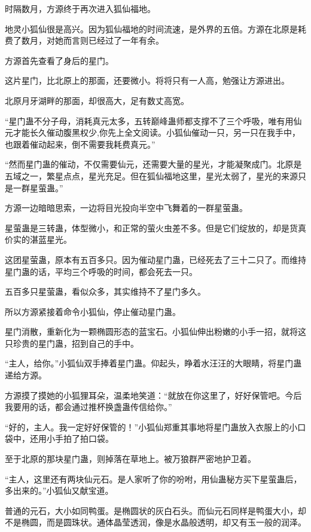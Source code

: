 
\begin{this_body}



时隔数月，方源终于再次进入狐仙福地。

地灵小狐仙很是高兴。因为狐仙福地的时间流速，是外界的五倍。方源在北原是耗费了数月，对她而言则已经过了一年有余。

方源首先查看了身后的星门。

这片星门，比北原上的那面，还要微小。将将只有一人高，勉强让方源进出。

北原月牙湖畔的那面，却很高大，足有数丈高宽。

“星门蛊不分子母，消耗真元太多，五转巅峰蛊师都支撑不了三个呼吸，唯有用仙元才能长久催动腹黑权少,你先上全文阅读。小狐仙催动一只，另一只在我手中，也跟着催动起来，倒不需要我耗费真元。”

“然而星门蛊的催动，不仅需要仙元，还需要大量的星光，才能凝聚成门。北原是五域之一，繁星点点，星光充足。但在狐仙福地这里，星光太弱了，星光的来源只是一群星萤蛊。”

方源一边暗暗思索，一边将目光投向半空中飞舞着的一群星萤蛊。

星萤蛊是三转蛊，体型微小，和正常的萤火虫差不多。但是它们绽放的，却是货真价实的湛蓝星光。

这团星萤蛊，原本有五百多只。因为催动星门蛊，已经死去了三十二只了。而维持星门蛊的话，平均三个呼吸的时间，都会死去一只。

五百多只星萤蛊，看似众多，其实维持不了星门多久。

所以方源紧接着命令小狐仙，停止催动星门蛊。

星门消散，重新化为一颗椭圆形态的蓝宝石。小狐仙伸出粉嫩的小手一招，就将这只珍贵的星门蛊，招到自己的手中。

“主人，给你。”小狐仙双手捧着星门蛊。仰起头，睁着水汪汪的大眼睛，将星门蛊递给方源。

方源摸了摸她的小狐狸耳朵，温柔地笑道：“就放在你这里了，好好保管吧。今后我要用的话，都会通过推杯换盏蛊传信给你。”

“好的，主人。我一定好好保管的！”小狐仙郑重其事地将星门蛊放入衣服上的小口袋中，还用小手拍了拍口袋。

至于北原的那块星门蛊，则掉落在草地上。被万狼群严密地护卫着。

“主人，这里还有两块仙元石。是人家听了你的吩咐，用仙蛊秘方买下星萤蛊后，多出来的。”小狐仙又献宝道。

普通的元石，大小如同鸭蛋。是椭圆状的灰白石头。而仙元石同样是鸭蛋大小，却不是椭圆，而是圆珠状。通体晶莹透润，像是水晶般透明，却又有玉一般的润泽。


\end{this_body}
